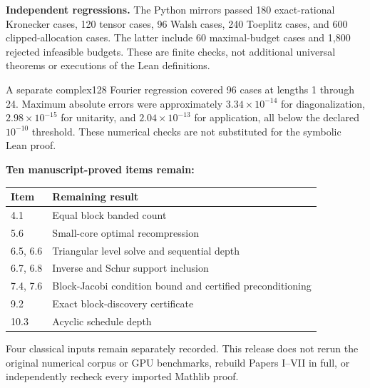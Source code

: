 \documentclass[11pt]{article}
\begin{document}
\textbf{Independent regressions.} The Python mirrors passed 180 exact-rational Kronecker cases, 120 tensor cases, 96 Walsh cases, 240 Toeplitz cases, and 600 clipped-allocation cases. The latter include 60 maximal-budget cases and 1,800 rejected infeasible budgets. These are finite checks, not additional universal theorems or executions of the Lean definitions.

A separate complex128 Fourier regression covered 96 cases at lengths 1 through 24. Maximum absolute errors were approximately $3.34\times10^{-14}$ for diagonalization, $2.98\times10^{-15}$ for unitarity, and $2.04\times10^{-13}$ for application, all below the declared $10^{-10}$ threshold. These numerical checks are not substituted for the symbolic Lean proof.

\textbf{Ten manuscript-proved items remain:}
\begin{center}\small
\begin{tabular}{@{}lp{}@{}}
\toprule
Item & Remaining result\\\midrule
4.1 & Equal block banded count\\
5.6 & Small-core optimal recompression\\
6.5, 6.6 & Triangular level solve and sequential depth\\
6.7, 6.8 & Inverse and Schur support inclusion\\
7.4, 7.6 & Block-Jacobi condition bound and certified preconditioning\\
9.2 & Exact block-discovery certificate\\
10.3 & Acyclic schedule depth\\\bottomrule
\end{tabular}
\end{center}
Four classical inputs remain separately recorded. This release does not rerun the original numerical corpus or GPU benchmarks, rebuild Papers I--VII in full, or independently recheck every imported Mathlib proof.
\end{document}
